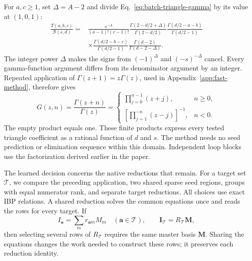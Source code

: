 For \(a,c\ge1\), set \(\Delta=A-2\) and divide Eq.~\eqref{eq:batch-triangle-gamma} by its value at \((1,0,1)\):
\begin{align}
 \frac{T(a,b,c)}{\mathcal B(s,d)}
 ={}&
 \frac{s^{-\Delta}}{(a-1)!(c-1)!}
 \frac{\Gamma(2-d/2+\Delta)}{\Gamma(2-d/2)}
 \frac{\Gamma(d/2-a-b)}{\Gamma(d/2-1)}
 \nonumber\\
 &\times
 \frac{\Gamma(d/2-b-c)}{\Gamma(d/2-1)}
 \frac{\Gamma(d-2)}{\Gamma(d-2-\Delta)}.
 \label{eq:batch-triangle-ratio}
\end{align}
The integer power \(\Delta\) makes the signs from \((-1)^\Delta\) and \((-s)^{-\Delta}\) cancel. Every gamma-function argument differs from its denominator argument by an integer. Repeated application of \(\Gamma(z+1)=z\Gamma(z)\), used in Appendix~\ref{app:fast-method}, therefore gives
\begin{equation}
 G(z,n)=\frac{\Gamma(z+n)}{\Gamma(z)}
 =
 \begin{cases}
 \displaystyle\prod_{j=0}^{n-1}(z+j),&n\ge0,\\[4pt]
 \displaystyle\left[\prod_{j=1}^{-n}(z-j)\right]^{-1},&n<0 .
 \end{cases}
 \label{eq:batch-gamma-shift}
\end{equation}
The empty product equals one. These finite products express every tested triangle coefficient as a rational function of \(d\) and \(s\). The method needs no seed prediction or elimination sequence within this domain. Independent loop blocks use the factorization derived earlier in the paper.

The learned decision concerns the native reductions that remain. For a target set \(\mathcal T\), we compare the preceding application, two shared sparse seed regions, groups with equal numerator rank, and separate target reductions. All choices use exact IBP relations. A shared reduction solves the common equations once and reads the rows for every target. If
\begin{equation}
 I_{\mathbf a}=\sum_m r_{\mathbf a m}M_m
 \quad(\mathbf a\in\mathcal T),
 \qquad
 \mathbf I_{\mathcal T}=R_{\mathcal T}\mathbf M,
 \label{eq:batch-shared}
\end{equation}
then selecting several rows of \(R_{\mathcal T}\) requires the same master basis \(\mathbf M\). Sharing the equations changes the work needed to construct these rows; it preserves each reduction identity.

